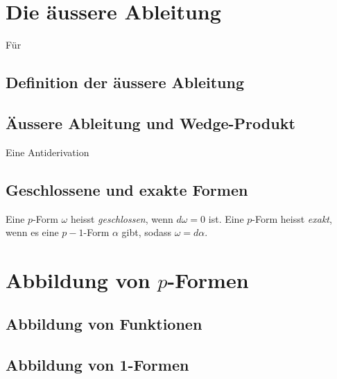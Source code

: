 %
%
\section{Die äussere Ableitung
\label{buch:pformen:section:aeussereableitung}}
Für 

%
%
\subsection{Definition der äussere Ableitung}


%
%
\subsection{Äussere Ableitung und Wedge-Produkt}

\begin{satz}

\end{satz}

\begin{definition}
Eine Antiderivation 
\end{definition}


\subsection{Geschlossene und exakte Formen}

\begin{definition}
Eine $p$-Form $\omega$ heisst {\em geschlossen}, wenn $d\omega=0$ ist.
%
Eine $p$-Form heisst {\em exakt}, wenn es eine $p-1$-Form $\alpha$ gibt,
sodass $\omega = d\alpha$.
%
\end{definition}


%
%
\section{Abbildung von $p$-Formen
\label{buch:pformen:section:abbildung}}

\subsection{Abbildung von Funktionen}
% 

\subsection{Abbildung von 1-Formen}

